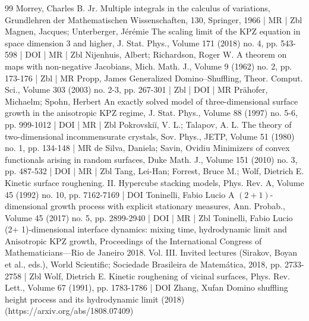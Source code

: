 \documentclass[10pt]{amsart}
\theoremstyle{definition}\newtheorem{defi}[theo]{Definition}\newtheorem{rema}[theo]{Remark}\newtheorem{exam}[theo]{Example}\newtheorem{exem}[theo]{Example}\newtheorem{nota}[theo]{Notation}
\begin{document}
\begin{thebibliography}{99}
Morrey, Charles B. Jr. Multiple integrals in the calculus of variations, Grundlehren der Mathematischen Wissenschaften, 130, Springer, 1966 | MR | Zbl
Magnen, Jacques; Unterberger, Jérémie The scaling limit of the KPZ equation in space dimension 3 and higher, J. Stat. Phys., Volume 171 (2018) no. 4, pp. 543-598 | DOI | MR | Zbl
Nijenhuis, Albert; Richardson, Roger W. A theorem on maps with non-negative Jacobians, Mich. Math. J., Volume 9 (1962) no. 2, pp. 173-176 | Zbl | MR
Propp, James Generalized Domino–Shuffling, Theor. Comput. Sci., Volume 303 (2003) no. 2-3, pp. 267-301 | Zbl | DOI | MR
Prähofer, Michaelm; Spohn, Herbert An exactly solved model of three-dimensional surface growth in the anisotropic KPZ regime, J. Stat. Phys., Volume 88 (1997) no. 5-6, pp. 999-1012 | DOI | MR | Zbl
Pokrovskiĭ, V. L.; Talapov, A. L. The theory of two-dimensional incommensurate crystals, Sov. Phys., JETP, Volume 51 (1980) no. 1, pp. 134-148 | MR
de Silva, Daniela; Savin, Ovidiu Minimizers of convex functionals arising in random surfaces, Duke Math. J., Volume 151 (2010) no. 3, pp. 487-532 | DOI | MR | Zbl
Tang, Lei-Han; Forrest, Bruce M.; Wolf, Dietrich E. Kinetic surface roughening. II. Hypercube stacking models, Phys. Rev. A, Volume 45 (1992) no. 10, pp. 7162-7169 | DOI
Toninelli, Fabio Lucio A $(2+1)$-dimensional growth process with explicit stationary measures, Ann. Probab., Volume 45 (2017) no. 5, pp. 2899-2940 | DOI | MR | Zbl
Toninelli, Fabio Lucio (2+ 1)-dimensional interface dynamics: mixing time, hydrodynamic limit and Anisotropic KPZ growth, Proceedings of the International Congress of Mathematicians—Rio de Janeiro 2018. Vol. III. Invited lectures (Sirakov, Boyan et al., eds.), World Scientific; Sociedade Brasileira de Matemática, 2018, pp. 2733-2758 | Zbl
Wolf, Dietrich E. Kinetic roughening of vicinal surfaces, Phys. Rev. Lett., Volume 67 (1991), pp. 1783-1786 | DOI
Zhang, Xufan Domino shuffling height process and its hydrodynamic limit (2018) (https://arxiv.org/abs/1808.07409)
\end{thebibliography}
\end{document}
